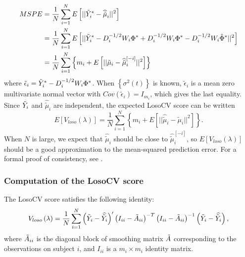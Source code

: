 \documentclass[../chapter-2-spline-representation.tex]{subfiles}
\begin{document}
\begin{align}
\begin{split}\label{eq:MSPE}
MSPE &= \frac{1}{N}\sum_{i=1}^N E\left[ \vert \vert \tilde{Y}^*_i - \widehat{\tilde{\mu}}_{i} \vert \vert^2 \right]\\
&=  \frac{1}{N}\sum_{i=1}^N E\left[ \vert \vert \tilde{Y}^*_i - D_i^{-1/2}W_i \Phi^* + D_i^{-1/2}W_i \Phi^* - D_i^{-1/2}W_i \hat{\Phi}^*\vert \vert^2 \right]\\
&=  \frac{1}{N}\sum_{i=1}^N \left\{m_i + E\left[ \vert \vert \tilde{\mu}_{i} - \widehat{\tilde{\mu}}^{\left[ -i \right]}_{i} \vert \vert^2 \right] \right\}
\end{split}
\end{align}
\noindent
where $\tilde{\epsilon}_i = \tilde{Y}^*_i - D_i^{-1/2}W_i \Phi^*$. When $\left\{ \sigma^2\left(t\right)\right\}$ is known, $\tilde{\epsilon}_i$ is a mean zero multivariate normal vector with $Cov\left(\tilde{\epsilon}_i\right) = I_{m_i}$, which gives the last equality. Since $\tilde{Y}_i$ and $ \widehat{\tilde{\mu}}_{i} $ are independent, the expected LosoCV score can be written
\begin{equation} \label{eq:MSPE_LOSOCV}
E\left[V_{loso}\left(\lambda\right) \right] =  \frac{1}{N}\sum_{i=1}^N\left\{ m_i +  E\left[ \vert \vert \widehat{\tilde{\mu}}_{i} - \tilde{\mu}_{i} \vert \vert^2 \right] \right\}. 
\end{equation}
\noindent
When $N$ is large, we expect that $\widehat{\tilde{\mu}}_{i}$ should be close to $\widehat{\tilde{\mu}}^{\left[ -i \right]}_{i}$, so $E\left[V_{loso}\left(\lambda\right) \right]$ should be a good approximation to the mean-squared prediction error. For a formal proof of consistency, see \citet{xu2012asymptotic}.

  \subsubsection{Computation of the LosoCV score}
  
  \begin{lemma} \label{lemma:losocv-shortcut}
  The LosoCV score satisfies the following identity:
  \begin{equation*}
 V_{loso}\left( \lambda \right) = \frac{1}{N} \sum_{i = 1}^N \left(\tilde{Y}_i - \widehat{\tilde{Y}_i}\right)' \left(I_{ii} - \tilde{A}_{ii}\right)^{-T}\left(I_{ii} - \tilde{A}_{ii}\right)^{-1}\left(\tilde{Y}_i - \widehat{\tilde{Y}_i}\right),
  \end{equation*}
  \noindent
  where $\tilde{A}_{ii}$ is the diagonal block of smoothing matrix $\tilde{A}$ corresponding to the observations on subject $i$, and $I_{ii}$ is a $m_i \times m_i$ identity matrix.
\end{lemma}
\end{document}
